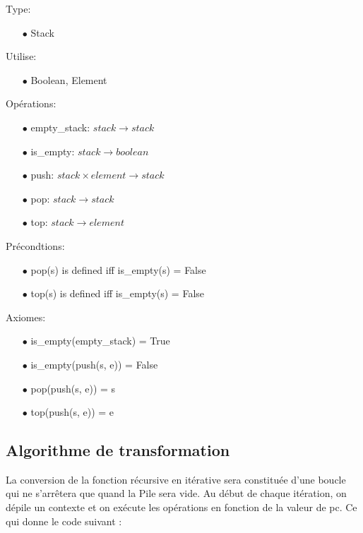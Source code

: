 \documentclass[a4paper, 11pt, oneside]{article}
\begin{document}
\noindent Type: 
    \begin{itemize}
        \item[$\bullet$] Stack
    \end{itemize}
    Utilise: 
    \begin{itemize}
        \item[$\bullet$] Boolean, Element
    \end{itemize}
    Opérations: 
    \begin{itemize}
        \item[$\bullet$] empty\_stack: $stack \rightarrow stack$
        \item[$\bullet$] is\_empty: $stack \rightarrow boolean$
        \item[$\bullet$] push: $stack \times element \rightarrow stack$
        \item[$\bullet$] pop: $stack \rightarrow stack$
        \item[$\bullet$] top: $stack \rightarrow element$
    \end{itemize}
    Précondtions:
    \begin{itemize}
        \item[$\bullet$] pop(s) is defined iff is\_empty(s) = False
        \item[$\bullet$] top(s) is defined iff is\_empty(s) = False
    \end{itemize}
    Axiomes: 
    \begin{itemize}
        \item[$\bullet$] is\_empty(empty\_stack) = True
        \item[$\bullet$] is\_empty(push(s, e)) = False
        \item[$\bullet$] pop(push(s, e)) = s
        \item[$\bullet$] top(push(s, e)) = e
    \end{itemize}

\subsection{Algorithme de transformation}

La conversion de la fonction récursive en itérative sera constituée d’une boucle
qui ne s’arrêtera que quand la Pile sera vide. Au début de chaque itération, on
dépile un contexte et on exécute les opérations en fonction de la valeur de pc. Ce
qui donne le code suivant :
\end{document}
